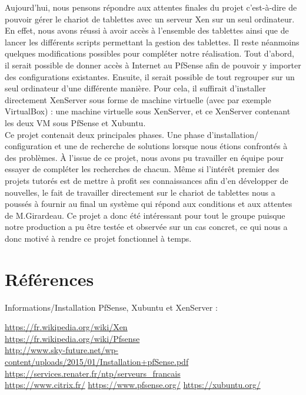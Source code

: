 \documentclass[a4paper,12pt]{extarticle}
\begin{document}
Aujourd’hui, nous pensons répondre aux attentes finales du projet c’est-à-dire de pouvoir gérer le chariot de tablettes avec un serveur Xen sur un seul ordinateur. En effet, nous avons réussi à avoir accès à l’ensemble des tablettes ainsi que de lancer les différents scripts permettant la gestion des tablettes.\newline
Il reste néanmoins quelques modifications possibles pour compléter notre réalisation.
Tout d’abord, il serait possible de donner accès à Internet au PfSense afin de pouvoir y importer des configurations existantes. Ensuite, il serait possible de tout regrouper sur un seul ordinateur d’une différente manière. Pour cela, il suffirait d’installer directement XenServer sous forme de machine virtuelle (avec par exemple VirtualBox) : une machine virtuelle sous XenServer, et ce XenServer contenant les deux VM sous PfSense et Xubuntu.\\

Ce projet contenait deux principales phases. Une phase d’installation/ configuration et une de recherche de solutions lorsque nous étions confrontés à des problèmes.
À l’issue de ce projet, nous avons pu travailler en équipe pour essayer de compléter les recherches de chacun. Même si l'intérêt premier des projets tutorés est de mettre à profit ses connaissances afin d’en développer de nouvelles, le fait de travailler directement sur le chariot de tablettes nous a poussés à fournir au final un système qui répond aux conditions et aux attentes de M.Girardeau. Ce projet a donc été intéressant pour tout le groupe puisque notre production a pu être testée et observée sur un cas concret, ce qui nous a donc motivé à rendre ce projet fonctionnel à temps. 

\clearpage
\section{Références}

Informations/Installation PfSense, Xubuntu et XenServer :

\url{https://fr.wikipedia.org/wiki/Xen}\\
\url{https://fr.wikipedia.org/wiki/Pfsense}\\
\url{http://www.sky-future.net/wp-content/uploads/2015/01/Installation+pfSense.pdf}\\
\url{https://services.renater.fr/ntp/serveurs_francais}\\
\url{https://www.citrix.fr/}
\url{https://www.pfsense.org/}
\url{https://xubuntu.org/}
\end{document}
